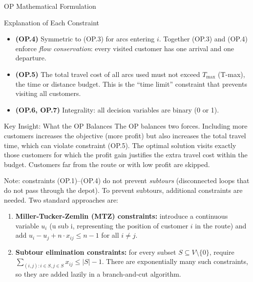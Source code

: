 \documentclass[aspectratio=169,10pt]{beamer}
\begin{document}
\begin{frame}[allowframebreaks]{OP Mathematical Formulation}
\begin{block}{Explanation of Each Constraint}
\begin{itemize}
      \item \textbf{(OP.4)} Symmetric to (OP.3) for arcs entering $i$.
            Together (OP.3) and (OP.4) enforce \emph{flow conservation}:
            every visited customer has one arrival and one departure.

      \item \textbf{(OP.5)} The total travel cost of all arcs used must not
            exceed $T_{\max}$ (T-max), the time or distance budget.
            This is the ``time limit'' constraint that prevents visiting
            all customers.

      \item \textbf{(OP.6, OP.7)} Integrality: all decision variables are
            binary (0 or 1).
    \end{itemize}
  \end{block}

  \medskip
  \begin{alertblock}{Key Insight: What the OP Balances}
    The OP balances two forces.
    Including more customers increases the objective (more profit) but also
    increases the total travel time, which can violate constraint (OP.5).
    The optimal solution visits exactly those customers for which the
    profit gain justifies the extra travel cost within the budget.
    Customers far from the route or with low profit are skipped.
  \end{alertblock}

  \framebreak

  Note: constraints (OP.1)--(OP.4) do not prevent \emph{subtours}
  (disconnected loops that do not pass through the depot).
  To prevent subtours, additional constraints are needed.
  Two standard approaches are:
  \begin{enumerate}
    \item \textbf{Miller-Tucker-Zemlin (MTZ) constraints:}
          introduce a continuous variable $u_i$ (u sub i, representing the
          position of customer $i$ in the route) and add
          $u_i - u_j + n \cdot x_{ij} \le n - 1$ for all $i \neq j$.
    \item \textbf{Subtour elimination constraints:}
          for every subset $S \subseteq V \setminus \{0\}$,
          require $\sum_{(i,j): i \in S, j \in S} x_{ij} \le |S| - 1$.
          There are exponentially many such constraints, so they are
          added lazily in a branch-and-cut algorithm.
  \end{enumerate}

\end{frame}
\end{document}

